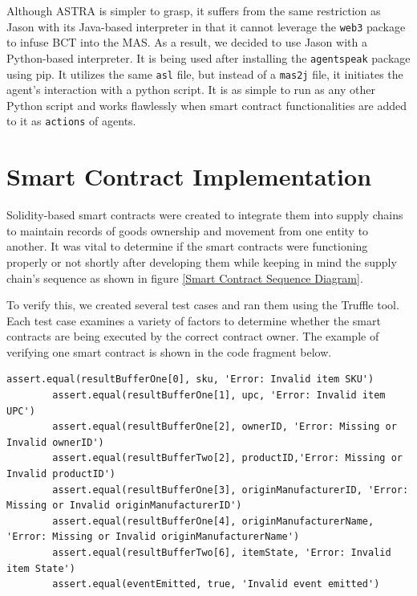 \vspace{.5cm}

Although ASTRA is simpler to grasp, it suffers from the same restriction as Jason with its Java-based interpreter in that it cannot leverage the \texttt{web3} package to infuse \ac{BCT} into the \ac{MAS}. As a result, we decided to use Jason with a Python-based interpreter. It is being used after installing the \texttt{agentspeak} package using \ac{pip}. It utilizes the same \texttt{asl} file, but instead of a \texttt{mas2j} file, it initiates the agent's interaction with a python script. It is as simple to run as any other Python script and works flawlessly when smart contract functionalities are added to it as \texttt{actions} of agents.

\section{Smart Contract Implementation }

Solidity-based smart contracts were created to integrate them into supply chains to maintain records of goods ownership and movement from one entity to another. It was vital to determine if the smart contracts were functioning properly or not shortly after developing them while keeping in mind the supply chain's sequence as shown in figure \ref{Smart Contract Sequence Diagram}. 

\vspace{.5cm}

To verify this, we created several test cases and ran them using the Truffle tool. Each test case examines a variety of factors to determine whether the smart contracts are being executed by the correct contract owner. The example of verifying one smart contract is shown in the code fragment below.

\vspace{.5cm}
\begin{lstlisting}[numbers=none, basicstyle=\ttfamily\tiny]
        assert.equal(resultBufferOne[0], sku, 'Error: Invalid item SKU')
        assert.equal(resultBufferOne[1], upc, 'Error: Invalid item UPC')
        assert.equal(resultBufferOne[2], ownerID, 'Error: Missing or Invalid ownerID')
        assert.equal(resultBufferTwo[2], productID,'Error: Missing or Invalid productID')
        assert.equal(resultBufferOne[3], originManufacturerID, 'Error: Missing or Invalid originManufacturerID')
        assert.equal(resultBufferOne[4], originManufacturerName, 'Error: Missing or Invalid originManufacturerName')
        assert.equal(resultBufferTwo[6], itemState, 'Error: Invalid item State')
        assert.equal(eventEmitted, true, 'Invalid event emitted')
\end{lstlisting}

